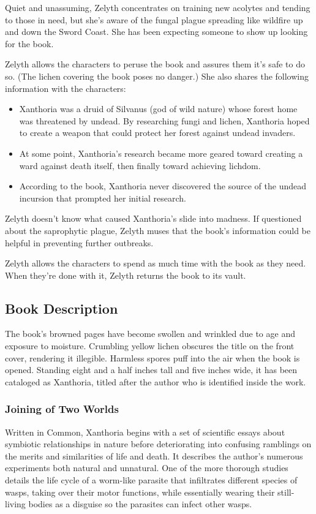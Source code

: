 \documentclass[10pt,a4paper,twoside,bg=print,twocolumn,openany,nodeprecatedcode]{dndbook}
\begin{document}
Quiet and unassuming, Zelyth concentrates on training new acolytes and tending to those in need, but she's aware of the fungal plague spreading like wildfire up and down the Sword Coast. She has been expecting someone to show up looking for the book.

Zelyth allows the characters to peruse the book and assures them it's safe to do so. (The lichen covering the book poses no danger.) She also shares the following information with the characters:


\begin{itemize}
\item Xanthoria was a druid of Silvanus (god of wild nature) whose forest home was threatened by undead. By researching fungi and lichen, Xanthoria hoped to create a weapon that could protect her forest against undead invaders.
\item At some point, Xanthoria's research became more geared toward creating a ward against death itself, then finally toward achieving lichdom.
\item According to the book, Xanthoria never discovered the source of the undead incursion that prompted her initial research.
\end{itemize}

Zelyth doesn't know what caused Xanthoria's slide into madness. If questioned about the saprophytic plague, Zelyth muses that the book's information could be helpful in preventing further outbreaks.

Zelyth allows the characters to spend as much time with the book as they need. When they're done with it, Zelyth returns the book to its vault.

\subsection{Book Description}
The book's browned pages have become swollen and wrinkled due to age and exposure to moisture. Crumbling yellow lichen obscures the title on the front cover, rendering it illegible. Harmless spores puff into the air when the book is opened. Standing eight and a half inches tall and five inches wide, it has been cataloged as Xanthoria, titled after the author who is identified inside the work.

\subsubsection{Joining of Two Worlds}
Written in Common, Xanthoria begins with a set of scientific essays about symbiotic relationships in nature before deteriorating into confusing ramblings on the merits and similarities of life and death. It describes the author's numerous experiments both natural and unnatural. One of the more thorough studies details the life cycle of a worm-like parasite that infiltrates different species of wasps, taking over their motor functions, while essentially wearing their still-living bodies as a disguise so the parasites can infect other wasps.
\end{document}

